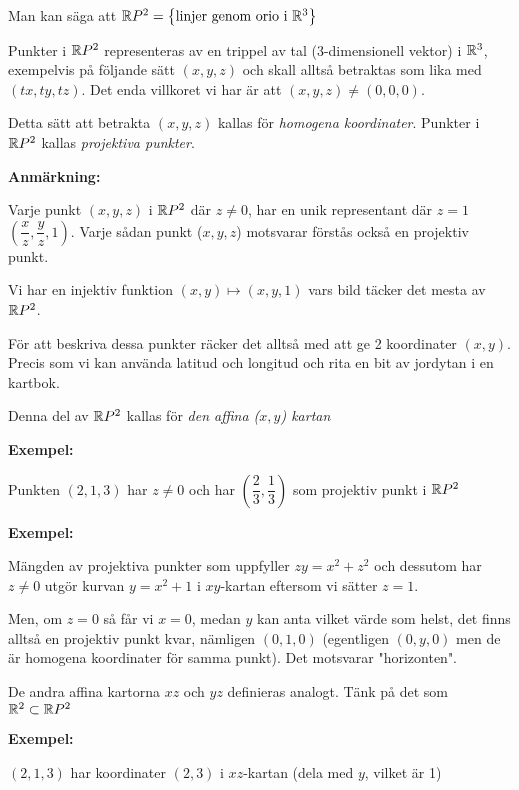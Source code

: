 \par\bigskip
\noindent Man kan säga att $\mathbb{R} P^2 = \left\{\text{linjer genom orio i $\mathbb{R}^3$}\right\}$
\par\bigskip
\noindent Punkter i $\mathbb{R} P^2$ representeras av en trippel av tal (3-dimensionell vektor) i $\mathbb{R}^3$, exempelvis på följande sätt $(x,y,z)$ och skall alltså betraktas som lika med $(tx,ty,tz)$. Det enda villkoret vi har är att $(x,y,z)\neq(0,0,0)$.\par
\noindent Detta sätt att betrakta $(x,y,z)$ kallas för \textit{homogena koordinater}. Punkter i $\mathbb{R} P^2$ kallas \textit{projektiva punkter}.
\par\bigskip
\noindent\textbf{Anmärkning:}\par
\noindent Varje punkt $(x,y,z)$ i $\mathbb{R} P^2$ där $z\neq0$, har en unik representant där $z=1$ $\left(\dfrac{x}{z},\dfrac{y}{z},1\right)$. Varje sådan punkt ($x,y,z$) motsvarar förstås också en projektiv punkt.\par
\noindent Vi har en injektiv funktion $(x,y)\mapsto(x,y,1)$ vars bild täcker det mesta av $\mathbb{R} P^2$.\par
\noindent För att beskriva dessa punkter räcker det alltså med att ge 2 koordinater $(x,y)$. Precis som vi kan använda latitud och longitud och rita en bit av jordytan i en kartbok.\par
\noindent Denna del av $\mathbb{R} P^2$ kallas för \textit{den affina ($x,y$) kartan}
\par\bigskip
\noindent\textbf{Exempel:}\par
\noindent Punkten $(2,1,3)$  har $z\neq0$ och har $\left(\dfrac{2}{3},\dfrac{1}{3}\right)$ som projektiv punkt i $\mathbb{R} P^2$
\par\bigskip
\noindent\textbf{Exempel:}\par
\noindent Mängden av projektiva punkter som uppfyller $zy = x^2+z^2$ och dessutom har $z\neq0$ utgör kurvan $y=x^2+1$ i $xy$-kartan eftersom vi sätter $z=1$.\par
\noindent Men, om $z=0$ så får vi $x=0$, medan $y$ kan anta vilket värde som helst, det finns alltså en projektiv punkt kvar, nämligen $(0,1,0)$ (egentligen $(0,y,0)$ men de är homogena koordinater för samma punkt). Det motsvarar "horizonten".
\par\bigskip
\noindent De andra affina kartorna $xz$ och $yz$  definieras analogt. Tänk på det som $\mathbb{R}^2\subset \mathbb{R} P^2$
\par\bigskip
\noindent\textbf{Exempel:}\par
\noindent $(2,1,3)$ har koordinater $(2,3)$ i $xz$-kartan (dela med $y$, vilket är 1)
